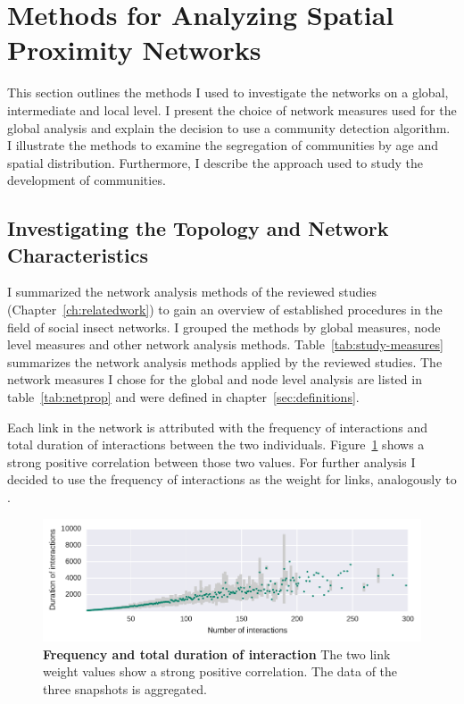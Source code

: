 \section{Methods for Analyzing Spatial Proximity Networks}
This section outlines the methods I used to investigate the networks on a global, intermediate and local level.
I present the choice of network measures used for the global analysis and explain the decision to use a community detection algorithm.
I illustrate the methods to examine the segregation of communities by age and spatial distribution.
Furthermore, I describe the approach used to study the development of communities.

\subsection{Investigating the Topology and Network Characteristics}
\label{subsec:APmeasures}
I summarized the network analysis methods of the reviewed studies (Chapter~\ref{ch:relatedwork}) to gain an overview of established procedures in the field of social insect networks.
I grouped the methods by global measures, node level measures and other network analysis methods.
Table~\ref{tab:study-measures} summarizes the network analysis methods applied by the reviewed studies.
The network measures I chose for the global and node level analysis are listed in table~\ref{tab:netprop} and were defined in chapter~\ref{sec:definitions}.

Each link in the network is attributed with the frequency of interactions and total duration of interactions between the two individuals.
Figure~\ref{fig:fVSd} shows a strong positive correlation between those two values.
For further analysis I decided to use the frequency of interactions as the weight for links, analogously to \cite{mersch2013tracking,baracchi2014socio}.


\begin{figure}[tb]
	\centering
	\includegraphics[width=1.0\textwidth]{Figures/n3-freqVSduration}
	\caption[Frequency and total duration of interaction]{\textbf{Frequency and total duration of interaction} The two link weight values show a strong positive correlation. The data of the three snapshots is aggregated.}
	\label{fig:fVSd}
\end{figure}

